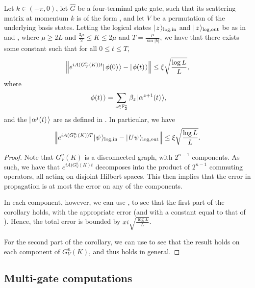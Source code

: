 \documentclass[../thesis-main/thesis-main]{subfiles}
\begin{document}
\begin{corollary}
\label{cor:multi_qubit_single_gate_encoded_computation}
  Let $k\in (-\pi,0)$, let $\widehat{G}$ be a four-terminal gate gate, such that its scattering matrix at momentum $k$ is of the form , and let $V$ be a permutation of the underlying basis states.  Letting the logical states $|\mspace{2mu} z \mspace{2mu} \rangle_{\text{log},\text{in}}$ and $|\mspace{2mu} z \mspace{2mu} \rangle_{\text{log},\text{out}}$ be as in  and , where $\mu \geq 2L$ and $\frac{3\mu}{2} \leq K \leq 2\mu$ and $T = \frac{\mu}{\sin |k|}$, we have that there exists some constant such that for all $0 \leq t \leq T$, 
\begin{align}
  \Big\Vert e^{i A(G_V^n(K))t} |\mspace{2mu} \phi(0) \mspace{2mu} \rangle - |\mspace{2mu} \phi(t) \mspace{2mu} \rangle \Big\Vert \leq \xi \sqrt{\frac{\log L}{L}},
\end{align}
where
\begin{align}
  |\mspace{2mu} \phi(t) \mspace{2mu} \rangle = \sum_{z\in \mathbb{F}_2^n} \beta_z |\mspace{2mu} \alpha^{z+1}(t) \mspace{2mu} \rangle,
\end{align}
and the $|\mspace{2mu} \alpha^j(t) \mspace{2mu} \rangle$ are as defined in .  In particular, we have
\begin{align}
  \Big\Vert e^{i A(G_V^n(K)) T} |\mspace{2mu} \psi \mspace{2mu} \rangle_{\text{log},\text{in}} - |\mspace{2mu} U\psi \mspace{2mu} \rangle_{\text{log},\text{out}} \Big\Vert \leq \xi \sqrt{\frac{\log L}{L}}.
\end{align}
\end{corollary}
\begin{proof}
  Note that $G_V^n(K)$ is a disconnected graph, with $2^{n-1}$ components.  As such, we have that $e^{i A(G_V^n(K)t}$ decomposes into the product of $2^{n-1}$ commuting operators, all acting on disjoint Hilbert spaces.  This then implies that the error in propagation is at most the error on any of the components.
  
  In each component, however, we can use , to see that the first part of the corollary holds, with the appropriate error (and with a constant equal to that of ).  Hence, the total error is bounded by $xi \sqrt{\frac{\log L}{L}}$.
  
  For the second part of the corollary, we can use  to see that the result holds on each component of $G_V^n(K)$, and thus holds in general.
\end{proof}


\subsection{Multi-gate computations}
\end{document}
